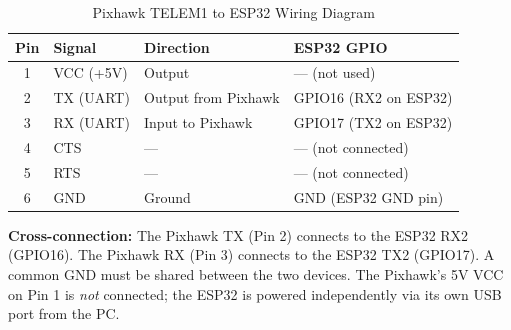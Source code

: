 \documentclass[11pt,a4paper]{article}
\begin{document}
\begin{table}[H]
    \centering
    \begin{tabular}{@{}clll@{}}
        \toprule
        \textbf{Pin} & \textbf{Signal} & \textbf{Direction} &
        \textbf{ESP32 GPIO} \\
        \midrule
        1 & VCC (+5V)  & Output  & --- (not used) \\
        2 & TX (UART)  & Output from Pixhawk & GPIO16 (RX2 on ESP32) \\
        3 & RX (UART)  & Input to Pixhawk    & GPIO17 (TX2 on ESP32) \\
        4 & CTS        & ---     & --- (not connected) \\
        5 & RTS        & ---     & --- (not connected) \\
        6 & GND        & Ground  & GND (ESP32 GND pin) \\
        \bottomrule
    \end{tabular}
    \caption{Pixhawk TELEM1 to ESP32 Wiring Diagram}
\end{table}

\begin{notebox}
    \textbf{Cross-connection:} The Pixhawk TX (Pin 2) connects to the ESP32 RX2
    (GPIO16). The Pixhawk RX (Pin 3) connects to the ESP32 TX2 (GPIO17).
    A common GND must be shared between the two devices. The Pixhawk's 5V VCC
    on Pin 1 is \emph{not} connected; the ESP32 is powered independently via its
    own USB port from the PC.
\end{notebox}
\end{document}
